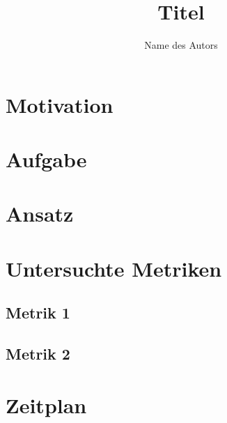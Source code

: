 \documentclass[fontsize=11pt,%
               paper=a4,%
               DIV=17]{scrartcl}
\title{Titel}
\author{Name des Autors}
\begin{document}
\maketitle

\section*{Motivation}
\blindtext

\section*{Aufgabe}
\blindtext

\section*{Ansatz}
\blindtext

\section*{Untersuchte Metriken}
\blindtext

\subsection*{Metrik 1}
\blindtext

\subsection*{Metrik 2}
\blindtext

\section*{Zeitplan}
\blindtext


\end{document}
